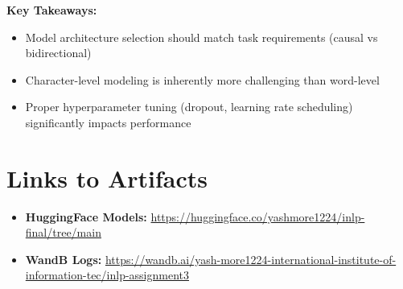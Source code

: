 \documentclass[12pt]{article}
\begin{document}
\textbf{Key Takeaways:}
\begin{itemize}
    \item Model architecture selection should match task requirements (causal vs bidirectional)
    \item Character-level modeling is inherently more challenging than word-level
    \item Proper hyperparameter tuning (dropout, learning rate scheduling) significantly impacts performance
\end{itemize}

\section*{Links to Artifacts}

\begin{itemize}
    \item \textbf{HuggingFace Models:} \url{https://huggingface.co/yashmore1224/inlp-final/tree/main}
    \item \textbf{WandB Logs:} \url{https://wandb.ai/yash-more1224-international-institute-of-information-tec/inlp-assignment3}
\end{itemize}
\end{document}
